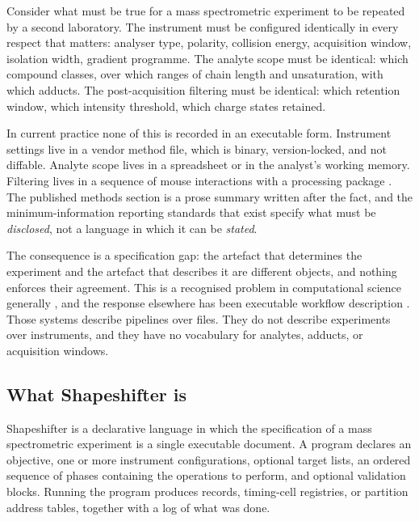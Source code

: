\documentclass[11pt,twocolumn,a4paper]{article}
\theoremstyle{ssthm}
\theoremstyle{definition}
\theoremstyle{remark}
\begin{document}
Consider what must be true for a mass spectrometric experiment to be
repeated by a second laboratory. The instrument must be configured
identically in every respect that matters: analyser type, polarity,
collision energy, acquisition window, isolation width, gradient
programme. The analyte scope must be identical: which compound classes,
over which ranges of chain length and unsaturation, with which adducts.
The post-acquisition filtering must be identical: which retention window,
which intensity threshold, which charge states retained.

In current practice none of this is recorded in an executable form.
Instrument settings live in a vendor method file, which is binary,
version-locked, and not diffable. Analyte scope lives in a spreadsheet or
in the analyst's working memory. Filtering lives in a sequence of
mouse interactions with a processing package
\citep{pluskal2010mzmine,smith2006xcms,tsugawa2015msdial}. The published
methods section is a prose summary written after the fact, and the
minimum-information reporting standards that exist
\citep{taylor2007miape,sumner2007msi} specify what must be
\emph{disclosed}, not a language in which it can be \emph{stated}.

The consequence is a specification gap: the artefact that determines the
experiment and the artefact that describes it are different objects, and
nothing enforces their agreement. This is a recognised problem in
computational science generally
\citep{peng2011reproducible,sandve2013ten}, and the response elsewhere
has been executable workflow description
\citep{koster2012snakemake,ditommaso2017nextflow,goecks2010galaxy,%
amstutz2016cwl}. Those systems describe pipelines over files. They do not
describe experiments over instruments, and they have no vocabulary for
analytes, adducts, or acquisition windows.

\subsection{What Shapeshifter is}

Shapeshifter is a declarative language in which the specification of a
mass spectrometric experiment is a single executable document. A program
declares an objective, one or more instrument configurations, optional
target lists, an ordered sequence of phases containing the operations to
perform, and optional validation blocks. Running the program produces
records, timing-cell registries, or partition address tables, together
with a log of what was done.
\end{document}
